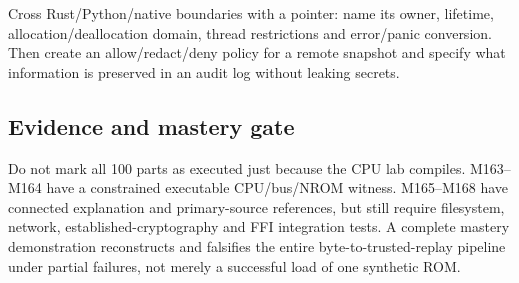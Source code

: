 Cross Rust/Python/native boundaries with a pointer: name its owner, lifetime, allocation/deallocation domain, thread restrictions and error/panic conversion. Then create an allow/redact/deny policy for a remote snapshot and specify what information is preserved in an audit log without leaking secrets.

\subsection{Evidence and mastery gate}\label{appendix-11f73b337e37-evidence-and-mastery-gate}

Do not mark all 100 parts as executed just because the CPU lab compiles. M163--M164 have a constrained executable CPU/bus/NROM witness. M165--M168 have connected explanation and primary-source references, but still require filesystem, network, established-cryptography and FFI integration tests. A complete mastery demonstration reconstructs and falsifies the entire byte-to-trusted-replay pipeline under partial failures, not merely a successful load of one synthetic ROM.

